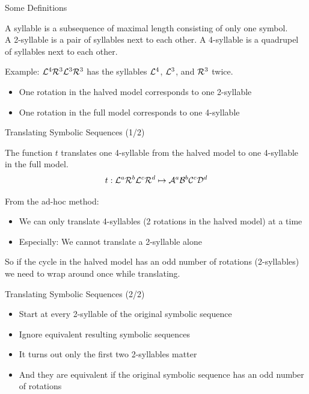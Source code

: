 \begin{frame}{Some Definitions}
	\vspace{-1em}
	\begin{definition}[Syllables]
		A syllable is a subsequence of maximal length consisting of only one symbol. \\[1em]
		A 2-syllable is a pair of syllables next to each other.
		A 4-syllable is a quadrupel of syllables next to each other.
	\end{definition}
	\pause
	Example: $\mathcal{L}^4\mathcal{R}^3\mathcal{L}^3\mathcal{R}^3$ has the syllables $\mathcal{L}^4$, $\mathcal{L}^3$, and $\mathcal{R}^3$ twice.
	\vspace{1em}
	\begin{itemize}
		\pause
		\item One rotation in the halved model corresponds to one 2-syllable
		\item One rotation in the full model corresponds to one 4-syllable
	\end{itemize}
\end{frame}

\begin{frame}{Translating Symbolic Sequences (1/2)}
	\vspace{-1em}
	\begin{definition}
		The function $t$ translates one 4-syllable from the halved model to one 4-syllable in the full model.
		\begin{align*}
			t: \mathcal{L}^a\mathcal{R}^b\mathcal{L}^c\mathcal{R}^d \mapsto \mathcal{A}^a\mathcal{B}^b\mathcal{C}^c\mathcal{D}^d
		\end{align*}
	\end{definition}

	\pause
	From the ad-hoc method:
	\pause
	\begin{itemize}
		\item We can only translate 4-syllables (2 rotations in the halved model) at a time \pause
		\item Especially: We cannot translate a 2-syllable alone
	\end{itemize}
	\pause
	So if the cycle in the halved model has an odd number of rotations (2-syllables) we need to wrap around once while translating.
\end{frame}

\begin{frame}{Translating Symbolic Sequences (2/2)}
	\begin{itemize}
		\item Start at every 2-syllable of the original symbolic sequence
		\item Ignore equivalent resulting symbolic sequences
		      \pause \vspace{2em}
		\item It turns out only the first two 2-syllables matter
		\item And they are equivalent if the original symbolic sequence has an odd number of rotations
	\end{itemize}
\end{frame}

